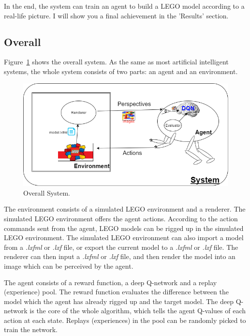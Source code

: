 \documentclass[a4paper]{article}
\begin{document}
        In the end, the system can train an agent to build a LEGO model according to a real-life picture. I will show you a final achievement in the 'Results' section.
    
        \subsection{Overall}
        
            Figure~\ref{fig:system1} shows the overall system. As the same as most artificial intelligent systems, the whole system consists of two parts: an agent and an environment.
            \begin{figure}[h]
                \centering
                \includegraphics[width=\textwidth]{agent_env.png}
                \caption{Overall System.}
                \label{fig:system1}
            \end{figure}
            
            The environment consists of a simulated LEGO environment and a renderer. The simulated LEGO environment offers the agent actions. According to the action commands sent from the agent, LEGO models can be rigged up in the simulated LEGO environment. The simulated LEGO environment can also import a model from a \textit{.lxfml} or \textit{.lxf} file, or export the current model to a \textit{.lxfml} or \textit{.lxf} file. The renderer can then input a \textit{.lxfml} or \textit{.lxf} file, and then render the model into an image which can be perceived by the agent. 
            
            The agent consists of a reward function, a deep Q-network and a replay (experience) pool. The reward function evaluates the difference between the model which the agent has already rigged up and the target model. The deep Q-network is the core of the whole algorithm, which tells the agent Q-values of each action at each state. Replays (experiences) in the pool can be randomly picked to train the network. 
            
\end{document}
